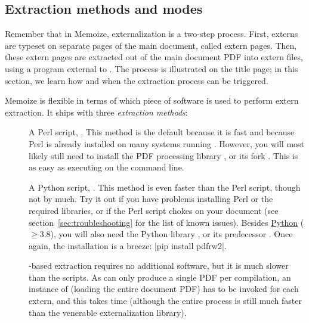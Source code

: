\documentclass[a4paper,11pt]{article}
\begin{document}
\subsection{Extraction methods and modes}
\label{sec:extraction}

Remember that in Memoize, externalization is a two-step process.  First,
externs are typeset on separate pages of the main document, called extern
pages.  Then, these extern pages are extracted out of the main document PDF
into extern files, using a program external to .  The process is
illustrated on the title page; in this section, we learn how and when the
extraction process can be triggered.

Memoize is flexible in terms of which piece of software is used to perform
extern extraction.  It ships with three \emph{extraction methods}:

\begin{description}
\item[] A Perl script, .
  This method is the default because it is fast and because Perl is already
  installed on many systems running .  However, you will most
  likely still need to install the PDF processing library
  , or its fork
  .  This is as
  easy as executing  on the command line.
\item[] A Python script, .
  This method is even faster than the Perl script, though not by much.  Try it
  out if you have problems installing Perl or the required libraries, or if the
  Perl script chokes on your document (see section~\ref{sec:troubleshooting}
  for the list of known issues).  Besides \href{https://www.python.org}{Python}
  ($\geq 3.8$), you will also need the Python library
  , or its predecessor
  .  Once again, the
  installation is a breeze: |pip install pdfrw2|.
\item[] -based extraction requires no
  additional software, but it is much slower than the scripts.  As 
  can only produce a single PDF per compilation, an instance of 
  (loading the entire document PDF) has to be invoked for each extern, and this
  takes time (although the entire process is still much faster than the
  venerable \TikZ externalization library).
\end{description}
\end{document}
